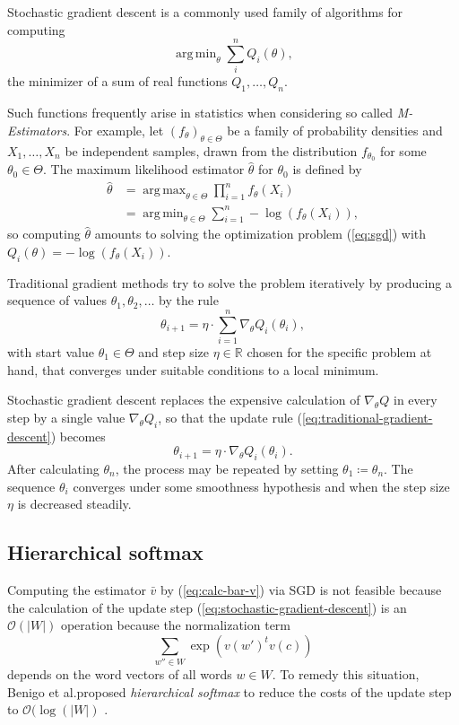 \documentclass{amsart}
\theoremstyle{plain}
\theoremstyle{definition}
\newcommand{\R}{\mathbb{R}}
\DeclareMathOperator*{\argmin}{arg\,min}
\DeclareMathOperator*{\argmax}{arg\,max}
\begin{document}
Stochastic gradient descent is a commonly used family of algorithms for computing
\begin{equation}
  \label{eq:sgd}
  \argmin_\theta \sum_i^n Q_i(\theta),
\end{equation}
the minimizer of a sum of real functions $Q_1, \dots, Q_n$.

Such functions frequently arise in statistics when considering so called \emph{M-Estimators}.
For example, let $(f_\theta)_{\theta \in \Theta}$ be a family of probability densities and $X_1, \dots, X_n$ be independent samples, drawn from the distribution $f_{\theta_0}$ for some $\theta_0 \in \Theta$.
The maximum likelihood estimator $\hat \theta$ for $\theta_0$ is defined by
\begin{align*}
  \hat \theta & = \argmax_{\theta \in \Theta} \prod_{i = 1}^n f_\theta(X_i) \\
              & = \argmin_{\theta \in \Theta} \sum_{i = 1}^n - \log(f_\theta(X_i)),
\end{align*}
so computing $\hat \theta$ amounts to solving the optimization problem (\ref{eq:sgd}) with $Q_i(\theta) = -\log(f_\theta(X_i))$.

Traditional gradient methods try to solve the problem iteratively by producing a sequence of values $\theta_1, \theta_2, \dots$ by the rule
\begin{equation}
  \label{eq:traditional-gradient-descent}
  \theta_{i + 1} = \eta \cdot \sum_{i = 1}^n \nabla_\theta Q_i(\theta_i),
\end{equation}
with start value $\theta_1 \in \Theta$ and step size $\eta \in \R$ chosen for the specific problem at hand, that converges under suitable conditions to a local minimum.

Stochastic gradient descent replaces the expensive calculation of $\nabla_\theta Q$ in every step by a single value $\nabla_\theta Q_i$, so that the update rule (\ref{eq:traditional-gradient-descent}) becomes
\begin{equation}
  \label{eq:stochastic-gradient-descent}
  \theta_{i + 1} = \eta \cdot \nabla_\theta Q_i(\theta_i).
\end{equation}
After calculating $\theta_n$, the process may be repeated by setting $\theta_1 \coloneqq \theta_n$.
The sequence $\theta_i$ converges under some smoothness hypothesis and when the step size $\eta$ is decreased steadily.

\subsection{Hierarchical softmax}
Computing the estimator $\bar v$ by (\ref{eq:calc-bar-v}) via SGD is not feasible because the calculation of the update step (\ref{eq:stochastic-gradient-descent}) is an $\mathcal{O}(|W|)$ operation because the normalization term
\begin{equation}
  \sum\limits_{w'' \in W} \exp(v(w')^t v(c))
\end{equation}
depends on the word vectors of all words $w \in W$.
To remedy this situation, Benigo et al.\@ proposed \emph{hierarchical softmax} to reduce the costs of the update step to $\mathcal{O}(\log(|W|)$ \cite{Morin05hierarchicalprobabilistic}.
\end{document}
